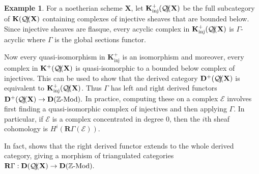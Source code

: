 \documentclass[a4paper]{article}
\theoremstyle{definition}
\newtheorem{example}[defn]{Example}
\theoremstyle{remark}
\newcommand{\Mod}{\ensuremath{\text{-Mod}}}
\newcommand{\deri}{\mathbf{D}}
\DeclareMathOperator{\Qcoh}{\mathcal{Q \kern -2pt c\kern -3pt o\kern -2pt h\kern -1pt}}
\begin{document}
\begin{example}
    For a noetherian scheme \(\mathbf{X}\), let
    \(\mathbf{K}^+_{\text{inj}}(\Qcoh\mathbf{X})\) be the full subcategory of
    \(\mathbf{K}(\Qcoh \mathbf{X})\) containing complexes of
    injective sheaves that are bounded below. Since injective sheaves are
    flasque, every acyclic complex in
    \(\mathbf{K}^+_{\text{inj}}(\Qcoh\mathbf{X})\) is \(\Gamma\)-acyclic where
    \(\Gamma\) is the global sections functor.

    Now every quasi-isomorphism in \(\mathbf{K}^+_{\text{inj}}\) is an
    isomorphism and moreover, every complex in \(\mathbf{K}^+(\Qcoh\mathbf{X})\)
    is quasi-isomorphic to a bounded below complex of injectives. This can be
    used to show that the derived category  \(\deri^+(\Qcoh \mathbf{X})\) is
    equivalent to \(\mathbf{K}^+_\text{inj}(\Qcoh\mathbf{X})\). Thus \(\Gamma\)
    has left and right derived functors \(\deri^+(\Qcoh \mathbf{X})\rightarrow
    \deri(\mathbb{Z}\Mod).\) In practice, computing these on a complex
    \(\mathscr{E}\) involves first finding a quasi-isomorphic complex of
    injectives and then applying \(\Gamma\). In particular, if \(\mathscr{E}\)
    is a complex concentrated in degree \(0\), then the \(i\)th sheaf cohomology
    is \(H^i(\mathbf{R}\Gamma(\mathscr{E}))\).

    In fact,  shows that the right derived
    functor extends to the whole derived category, giving a morphism of
    triangulated categories \(\mathbf{R}\Gamma:
    \deri(\Qcoh\mathbf{X})\rightarrow \deri(\mathbb{Z}\Mod).\)
\end{example}
\end{document}
